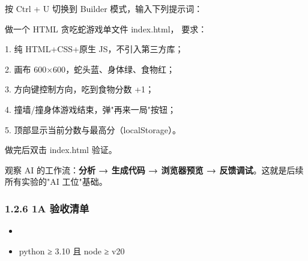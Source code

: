 \documentclass[
  american,
  chinese,
]{ctexart}
\begin{document}
{按}\foreignlanguage{american}{ Ctrl + U }{切换到}\foreignlanguage{american}{ Builder }{模式，输入下列提示词：}\foreignlanguage{american}{}

{做一个}\foreignlanguage{american}{ HTML }{贪吃蛇游戏{单文件}}\foreignlanguage{american}{ index.html}{，}{ }{要求：}\foreignlanguage{american}{}

\foreignlanguage{american}{1. }{纯}\foreignlanguage{american}{ HTML+CSS+}{原生}\foreignlanguage{american}{ JS}{，不引入第三方库；}{ \foreignlanguage{american}{}}

\foreignlanguage{american}{2. }{画布}\foreignlanguage{american}{ 600×600}{，蛇头蓝、身体绿、食物红；}{ \foreignlanguage{american}{}}

\foreignlanguage{american}{3. }{方向键控制方向，吃到食物分数}\foreignlanguage{american}{ +1}{；}{ \foreignlanguage{american}{}}

\foreignlanguage{american}{4. }{撞墙}\foreignlanguage{american}{/}{{撞身体}}{游戏结束，弹}\foreignlanguage{american}{"}{再来一局}\foreignlanguage{american}{"}{按钮；}{ \foreignlanguage{american}{}}

\foreignlanguage{american}{5. }{顶部显示当前分数与最高分（}{\foreignlanguage{american}{localStorage}}{）。}{ \foreignlanguage{american}{}}

{做完后双击}\foreignlanguage{american}{ index.html }{验证。}{ }\foreignlanguage{american}{}

{观察}\foreignlanguage{american}{ AI }{的工作流：\textbf{分析}}\textbf{{ \foreignlanguage{american}{→ }}{生成代码}{ \foreignlanguage{american}{→ }}{浏览器预览}{ \foreignlanguage{american}{→ }}{反馈调试}}{。这就是后续所有实验的}\foreignlanguage{american}{"AI }{工位}\foreignlanguage{american}{"}{基础。}\foreignlanguage{american}{}

\subsubsection{\texorpdfstring{\foreignlanguage{american}{1.2.6 1A }{\foreignlanguage{american}{验收清单}}}{1.2.6 1A 验收清单}}\label{a-ux9a8cux6536ux6e05ux5355}

\begin{itemize}
\item
  \foreignlanguage{american}{}

  ~
\item
  \foreignlanguage{american}{python ≥ 3.10 }\foreignlanguage{american}{且}\foreignlanguage{american}{ node ≥ v20}
\end{itemize}
\end{document}
